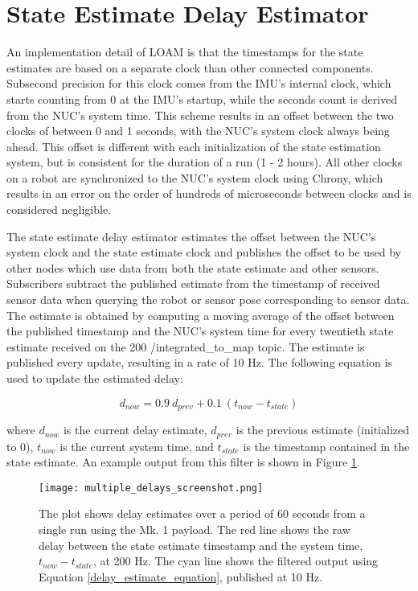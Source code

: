 \section{State Estimate Delay Estimator}

An implementation detail of LOAM is that the timestamps for the state estimates are based on a separate clock than other connected components. Subsecond precision for this clock comes from the IMU's internal clock, which starts counting from 0 at the IMU's startup, while the seconds count is derived from the NUC's system time. This scheme results in an offset between the two clocks of between 0 and 1 seconds, with the NUC's system clock always being ahead. This offset is different with each initialization of the state estimation system, but is consistent for the duration of a run (1 - 2 hours). All other clocks on a robot are synchronized to the NUC's system clock using Chrony, which results in an error on the order of hundreds of microseconds between clocks and is considered negligible.

The state estimate delay estimator estimates the offset between the NUC's system clock and the state estimate clock and publishes the offset to be used by other nodes which use data from both the state estimate and other sensors. Subscribers subtract the published estimate from the timestamp of received sensor data when querying the robot or sensor pose corresponding to sensor data. The estimate is obtained by computing a moving average of the offset between the published timestamp and the NUC's system time for every twentieth state estimate received on the 200 /integrated\_to\_map topic. The estimate is published every update, resulting in a rate of 10 Hz. The following equation is used to update the estimated delay:

\begin{equation} \label{delay_estimate_equation}
d_{now} = 0.9 \ d_{prev} + 0.1 \ (t_{now} - t_{state})
\end{equation}

where $d_{now}$ is the current delay estimate, $d_{prev}$ is the previous estimate (initialized to 0), $t_{now}$ is the current system time, and $t_{state}$ is the timestamp contained in the state estimate. An example output from this filter is shown in Figure \ref{multiple_delays}.

\begin{figure}	
	\centering
	\texttt{[image: multiple\_delays\_screenshot.png]}
	\caption[Raw and filtered state estimation delay]{The plot shows delay estimates over a period of 60 seconds from a single run using the Mk. 1 payload. The red line shows the raw delay between the state estimate timestamp and the system time, $t_{now} - t_{state}$, at 200 Hz. The cyan line shows the filtered output using Equation \ref{delay_estimate_equation}, published at 10 Hz.}
	\label{multiple_delays}
\end{figure}

